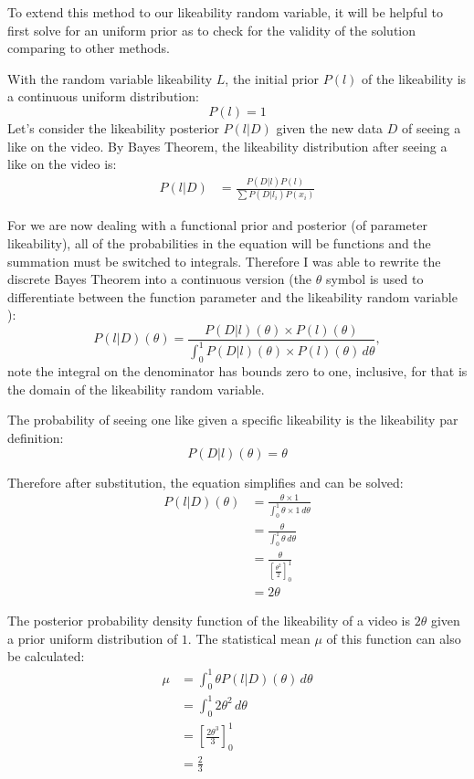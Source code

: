 \documentclass[a4paper,11pt]{article}
\begin{document}
To extend this method to our likeability random variable, it will be helpful to first solve for an uniform prior as to check for the validity of the solution comparing to other methods.

With the random variable likeability $L$, the initial prior $P(l)$ of the likeability is a continuous uniform distribution:
\[
    P(l) = 1
\]
Let's consider the likeability posterior $P(l|D)$ given the new data $D$ of seeing a like on the video. By Bayes Theorem, the likeability distribution after seeing a like on the video is:
\begin{align*}
    P(l|D) &= \frac{P(D|l) P(l)}{\sum P(D|l_i) P(x_i) }
\end{align*}

For we are now dealing with a functional prior and posterior (of parameter likeability), all of the probabilities in the equation will be functions and the summation must be switched to integrals. Therefore I was able to rewrite the discrete Bayes Theorem into a continuous version (the $\theta$ symbol is used to differentiate between the function parameter and the likeability random variable ):
\[
    P(l|D)(\theta) = \frac{P(D|l)(\theta) \times P(l)(\theta)}{\int_{0}^{1} P(D|l)(\theta) \times P(l)(\theta) \, d\theta},
\]
note the integral on the denominator has bounds zero to one, inclusive, for that is the domain of the likeability random variable.

The probability of seeing one like given a specific likeability is the likeability par definition:
\[
    P(D|l)(\theta) = \theta
\]

Therefore after substitution, the equation simplifies and can be solved:
\begin{align*}
    P(l|D)(\theta) &= \frac{\theta \times 1}{\int_{0}^{1} \theta \times 1 \, d\theta}\\
    &= \frac{\theta}{\int_0^1 \theta \, d\theta}\\
    &= \frac{\theta}{[\frac{\theta^2}{2}]^1_0}\\
    &= 2\theta
\end{align*}

The posterior probability density function of the likeability of a video is $2\theta$ given a prior uniform distribution of $1$. The statistical mean $\mu$ of this function can also be calculated:
\begin{align*}
    \mu &= \int_0^1 \theta P(l|D)(\theta) \, d\theta\\
    &= \int_0^1 2\theta^2 \, d\theta\\
    &= [\frac{2\theta^3}{3}]^1_0\\
    &= \frac{2}{3}
\end{align*}
\end{document}
